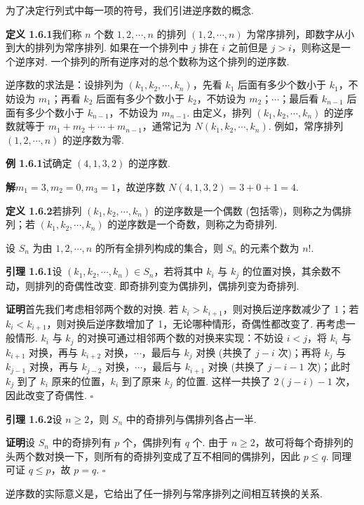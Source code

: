 \documentclass[UTF8, 12pt, fontset=fandol, oneside]{ctexart}
\begin{document}
为了决定行列式中每一项的符号，我们引进逆序数的概念.

\noindent\textbf{定义 1.6.1}\quad 我们称 $n$ 个数 $1,2,\cdots,n$ 的排列 $(1,2,\cdots,n)$ 为常序排列，即数字从小到大的排列为常序排列. 如果在一个排列中 $j$ 排在 $i$ 之前但是 $j>i$，则称这是一个逆序对. 一个排列的所有逆序对的总个数称为这个排列的逆序数.

逆序数的求法是：设排列为 $(k_1,k_2,\cdots,k_n)$，先看 $k_1$ 后面有多少个数小于 $k_1$，不妨设为 $m_1$；再看 $k_2$ 后面有多少个数小于 $k_2$，不妨设为 $m_2$；$\cdots$；最后看 $k_{n-1}$ 后面有多少个数小于 $k_{n-1}$，不妨设为 $m_{n-1}$. 由定义，排列 $(k_1,k_2,\cdots,k_n)$ 的逆序数就等于 $m_1+m_2+\cdots+m_{n-1}$，通常记为 $N(k_1,k_2,\cdots,k_n)$. 例如，常序排列 $(1,2,\cdots,n)$ 的逆序数为零.

\noindent\textbf{例 1.6.1}\quad 试确定 $(4,1,3,2)$ 的逆序数.

\noindent\textbf{解}\quad $m_1=3,m_2=0,m_3=1$，故逆序数 $N(4,1,3,2)=3+0+1=4$.

\noindent\textbf{定义 1.6.2}\quad 若排列 $(k_1,k_2,\cdots,k_n)$ 的逆序数是一个偶数 (包括零)，则称之为偶排列；若 $(k_1,k_2,\cdots,k_n)$ 的逆序数是一个奇数，则称之为奇排列.

设 $S_n$ 为由 $1,2,\cdots,n$ 的所有全排列构成的集合，则 $S_n$ 的元素个数为 $n!$.

\noindent\textbf{引理 1.6.1}\quad 设 $(k_1,k_2,\cdots,k_n)\in S_n$，若将其中 $k_i$ 与 $k_j$ 的位置对换，其余数不动，则排列的奇偶性改变. 即奇排列变为偶排列，偶排列变为奇排列.

\noindent\textbf{证明}\quad 首先我们考虑相邻两个数的对换. 若 $k_i>k_{i+1}$，则对换后逆序数减少了 1；若 $k_i<k_{i+1}$，则对换后逆序数增加了 1，无论哪种情形，奇偶性都改变了. 再考虑一般情形. $k_i$ 与 $k_j$ 的对换可通过相邻两个数的对换来实现：不妨设 $i<j$，将 $k_i$ 与 $k_{i+1}$ 对换，再与 $k_{i+2}$ 对换，$\cdots$，最后与 $k_j$ 对换 (共换了 $j-i$ 次)；再将 $k_j$ 与 $k_{j-1}$ 对换，再与 $k_{j-2}$ 对换，$\cdots$，最后与 $k_{i+1}$ 对换 (共换了 $j-i-1$ 次)；此时 $k_j$ 到了 $k_i$ 原来的位置，$k_i$ 到了原来 $k_j$ 的位置. 这样一共换了 $2(j-i)-1$ 次，因此改变了奇偶性. \(\square\)

\noindent\textbf{引理 1.6.2}\quad 设 $n\ge 2$，则 $S_n$ 中的奇排列与偶排列各占一半.

\noindent\textbf{证明}\quad 设 $S_n$ 中的奇排列有 $p$ 个，偶排列有 $q$ 个. 由于 $n\ge 2$，故可将每个奇排列的头两个数对换一下，则所有的奇排列变成了互不相同的偶排列，因此 $p\le q$. 同理可证 $q\le p$，故 $p=q$. \(\square\)

逆序数的实际意义是，它给出了任一排列与常序排列之间相互转换的关系.
\end{document}
